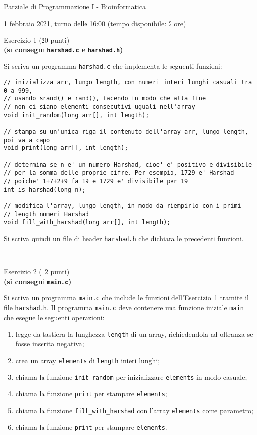 \documentclass[12pt]{article}
\begin{document}
\begin{center}{\LARGE Parziale di Programmazione I - Bioinformatica}\\
\vspace*{-2ex}
\begin{center}
  \large 1 febbraio 2021, turno delle 16:00 (tempo disponibile: 2 ore)
\end{center}
\end{center}

\vspace*{1ex}
\begin{center}{\Large Esercizio 1} ($20$ punti)\\
  \textbf{(si consegni \texttt{harshad.c} e \texttt{harshad.h})}
\end{center}
Si scriva un programma \texttt{harshad.c} che implementa le seguenti funzioni:
\begin{verbatim}
// inizializza arr, lungo length, con numeri interi lunghi casuali tra 0 a 999,
// usando srand() e rand(), facendo in modo che alla fine
// non ci siano elementi consecutivi uguali nell'array
void init_random(long arr[], int length);

// stampa su un'unica riga il contenuto dell'array arr, lungo length, poi va a capo
void print(long arr[], int length);

// determina se n e' un numero Harshad, cioe' e' positivo e divisibile
// per la somma delle proprie cifre. Per esempio, 1729 e' Harshad
// poiche' 1+7+2+9 fa 19 e 1729 e' divisibile per 19
int is_harshad(long n);

// modifica l'array, lungo length, in modo da riempirlo con i primi
// length numeri Harshad
void fill_with_harshad(long arr[], int length);
\end{verbatim}
%
Si scriva quindi un file di header \texttt{harshad.h} che dichiara le precedenti funzioni.

\mbox{}\\
\begin{center}{\Large Esercizio 2} ($12$ punti)\\
  \textbf{(si consegni \texttt{main.c})}\end{center}
%
Si scriva un programma \texttt{main.c} che include le funzioni dell'Esercizio~1 tramite
il file \texttt{harshad.h}.
Il programma \texttt{main.c} deve contenere una funzione iniziale \texttt{main} che esegue
le seguenti operazioni:
\begin{enumerate}
\item legge da tastiera la lunghezza \texttt{length} di un array, richiedendola ad oltranza se fosse inserita negativa;
\item crea un array \texttt{elements} di \texttt{length} interi lunghi;
\item chiama la funzione \texttt{init\_random} per inizializzare \texttt{elements} in modo casuale;
\item chiama la funzione \texttt{print} per stampare \texttt{elements};
\item chiama la funzione \texttt{fill\_with\_harshad} con l'array \texttt{elements} come parametro;
\item chiama la funzione \texttt{print} per stampare \texttt{elements}.
\end{enumerate}
\end{document}
